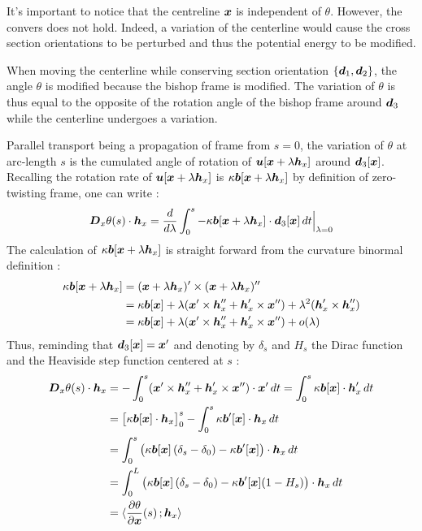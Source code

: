 It’s important to notice that the centreline $\boldsymbol{x}$ is independent of $\theta$. However, the convers does not hold. Indeed, a variation of the centerline would cause the cross section orientations to be perturbed and thus the potential energy to be modified.

When moving the centerline while conserving section orientation $\{\boldsymbol{d}_1,\boldsymbol{d}_2\}$,  the angle $\theta$ is modified because the bishop frame is modified. The variation of $\theta$ is thus equal to the opposite of the rotation angle of the bishop frame around $\boldsymbol{d}_3$ while the centerline undergoes a variation.

Parallel transport being a propagation of frame from $s = 0$, the variation of $\theta$ at arc-length $s$ is the cumulated angle of rotation of $\boldsymbol{u}[\boldsymbol{x} + \lambda\boldsymbol{h}_x]$ around $\boldsymbol{d}_3[\boldsymbol{x}]$. Recalling the rotation rate of $\boldsymbol{u}[\boldsymbol{x} + \lambda\boldsymbol{h}_x]$ is $\kappa\boldsymbol{b}[\boldsymbol{x} + \lambda\boldsymbol{h}_x]$ by definition of zero-twisting frame, one can write :
\begin{equation}
	\boldsymbol{D}_x\theta(s)\cdot\boldsymbol{h}_x =
	\frac{d}{d\lambda} \int_0^s -\kappa\boldsymbol{b}[\boldsymbol{x} + \lambda\boldsymbol{h}_x] \cdot \boldsymbol{d}_3[\boldsymbol{x}] \,dt \Bigr|_{\lambda = 0}
\end{equation}
The calculation of $\kappa\boldsymbol{b}[\boldsymbol{x} + \lambda\boldsymbol{h}_x]$ is straight forward from the curvature binormal definition :
\begin{equation}
	\begin{aligned}
	\kappa\boldsymbol{b}[\boldsymbol{x} + \lambda\boldsymbol{h}_x]
	&= (\boldsymbol{x} + \lambda\boldsymbol{h}_x)' \times (\boldsymbol{x} + \lambda\boldsymbol{h}_x)'' \\
	&= \kappa\boldsymbol{b}[\boldsymbol{x}] + \lambda(\boldsymbol{x}'\times\boldsymbol{h}''_x + \boldsymbol{h}'_x\times\boldsymbol{x}'') + \lambda^2(\boldsymbol{h}'_x \times \boldsymbol{h}''_x) \\
	&= \kappa\boldsymbol{b}[\boldsymbol{x}] + \lambda(\boldsymbol{x}'\times\boldsymbol{h}''_x + \boldsymbol{h}'_x\times\boldsymbol{x}'') + o(\lambda)
	\end{aligned}
\end{equation}
Thus, reminding that $\boldsymbol{d}_3[\boldsymbol{x}] = \boldsymbol{x}'$ and denoting by $\delta_s$ and $H_s$ the Dirac function and the Heaviside step function centered at $s$ :
\begin{equation}
	\begin{aligned}
		\boldsymbol{D}_x\theta(s)\cdot\boldsymbol{h}_x &= - \int_0^s (\boldsymbol{x}'\times\boldsymbol{h}''_x + \boldsymbol{h}'_x\times\boldsymbol{x}'') \cdot \boldsymbol{x}' \,dt = \int_0^s \kappa\boldsymbol{b}[\boldsymbol{x}] \cdot  \boldsymbol{h}'_x \,dt\\
		&= \big[\kappa\boldsymbol{b}[\boldsymbol{x}] \cdot  \boldsymbol{h}_x \big]_0^s - \int_0^s \kappa\boldsymbol{b}'[\boldsymbol{x}] \cdot  \boldsymbol{h}_x \,dt \\
		&= \int_0^s \left(\kappa\boldsymbol{b}[\boldsymbol{x}]\left(\delta_s-\delta_0\right) - \kappa\boldsymbol{b}'[\boldsymbol{x}]\right)\cdot  \boldsymbol{h}_x \,dt \\
		&= \int_0^L \left(\kappa\boldsymbol{b}[\boldsymbol{x}]\left(\delta_s-\delta_0\right) - \kappa\boldsymbol{b}'[\boldsymbol{x}](1-H_s)\right)\cdot  \boldsymbol{h}_x \,dt \\
		&= \langle \frac{\partial\theta}{\partial\boldsymbol{x}}(s)\,; \boldsymbol{h}_x\rangle
	\end{aligned}
\end{equation}
